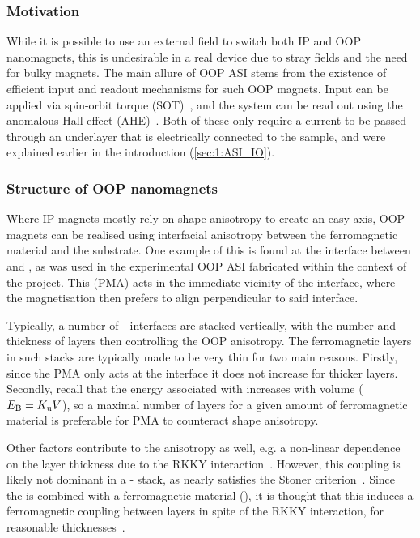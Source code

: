 \subsubsection{Motivation} %
While it is possible to use an external field to switch both IP and OOP nanomagnets, this is undesirable in a real device due to stray fields and the need for bulky magnets.
The main allure of OOP ASI stems from the existence of efficient input and readout mechanisms for such OOP magnets.
Input can be applied via spin-orbit torque (SOT)~\cite{SOT_FM_AFM,SOTswitchingCoPt}, and the system can be read out using the anomalous Hall effect (AHE)~\cite{AHE}.
Both of these only require a current to be passed through an underlayer that is electrically connected to the sample, and were explained earlier in the introduction (\cref{sec:1:ASI_IO}).

\subsubsection{Structure of OOP nanomagnets} %
\label{sec:3:OOP_nanomagnet_PMA}
Where IP magnets mostly rely on shape anisotropy to create an easy axis, OOP magnets can be realised using interfacial anisotropy between the ferromagnetic material and the substrate.
One example of this is found at the interface between  and , as was used in the experimental OOP ASI fabricated within the context of the \spinengine project.
This  (PMA) acts in the immediate vicinity of the interface, where the magnetisation then prefers to align perpendicular to said interface. \par
Typically, a number of - interfaces are stacked vertically, with the number and thickness of  layers then controlling the OOP anisotropy.
The ferromagnetic layers in such stacks are typically made to be very thin for two main reasons.
Firstly, since the PMA only acts at the interface it does not increase for thicker layers.
Secondly, recall that the energy associated with  increases with volume ($E_\mathrm{B}=K_\mathrm{u}V$), so a maximal number of layers for a given amount of ferromagnetic material is preferable for PMA to counteract shape anisotropy. \par
Other factors contribute to the anisotropy as well, e.g. a non-linear dependence on the  layer thickness due to the RKKY interaction~\cite{RKKY_RK,RKKY_K,RKKY_Y}.
However, this coupling is likely not dominant in a - stack, as  nearly satisfies the Stoner criterion~\cite{PtMagneticOrder}.
Since the  is combined with a ferromagnetic material (), it is thought that this induces a ferromagnetic coupling between  layers in spite of the RKKY interaction, for reasonable  thicknesses~\cite{PerpendicularMagnetizationASI}.

